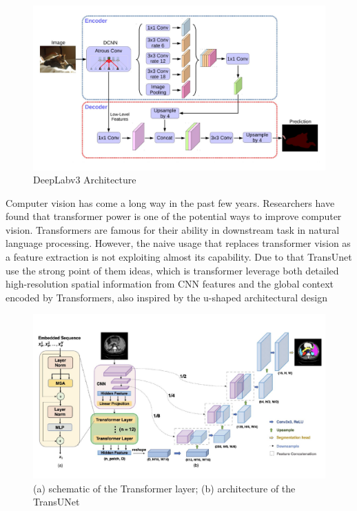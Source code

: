 \begin{figure}[h]
    \centering
    \includegraphics[width=\textwidth]{content/resources/new_images/related_works/deeplabv3.pdf}
    \caption{DeepLabv3 Architecture}
    \label{fig:deeplabv3}
\end{figure}

Computer vision has come a long way in the past few years. Researchers have found that transformer power is one of the potential ways to improve computer vision. Transformers are famous for their ability in downstream task in natural language processing. However, the naive usage that replaces transformer vision as a feature extraction is not exploiting almost its capability. Due to that TransUnet\cite{TransUnet} use the strong point of them ideas, which is transformer leverage both detailed high-resolution spatial information from CNN features and the global context encoded by Transformers, also inspired by the u-shaped architectural design 

\begin{figure}[h]
    \centering
    \includegraphics[width=\textwidth]{content/resources/new_images/related_works/transunet.pdf}
    \caption{(a) schematic of the Transformer layer; (b) architecture of the TransUNet}
    \label{fig:transunet}
\end{figure}